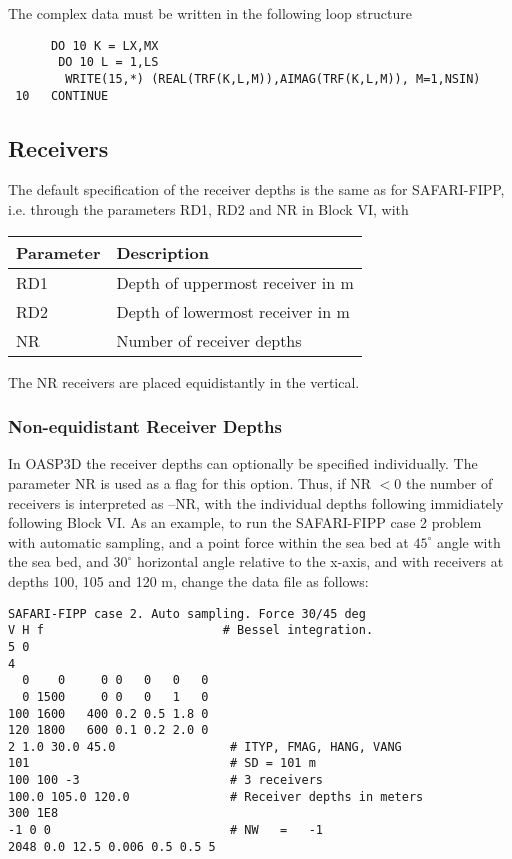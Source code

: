 \noindent The complex data must be written in the following loop structure

\small
\begin{verbatim}
      DO 10 K = LX,MX
       DO 10 L = 1,LS
        WRITE(15,*) (REAL(TRF(K,L,M)),AIMAG(TRF(K,L,M)), M=1,NSIN)
 10   CONTINUE
\end{verbatim}
\normalsize

\subsection{Receivers}

The default specification of the receiver depths is the same as for
SAFARI-FIPP, i.e. through the parameters RD1, RD2 and NR in Block VI, with

\begin{tabular}{ll}
Parameter & Description \\
\hline
RD1 & Depth of uppermost receiver in m \\
RD2 & Depth of lowermost receiver in m \\
NR  & Number of receiver depths 
\end{tabular}

The NR receivers are placed equidistantly in the vertical.

\subsubsection{Non-equidistant Receiver Depths}

In OASP3D the receiver depths can optionally be specified individually.
The parameter NR is used as a flag for this option. Thus, if NR $< 0$
the number of receivers is interpreted as --NR, with the individual
depths following immidiately following Block VI. 
As an example, to run the SAFARI-FIPP case 2 problem with automatic
sampling, and a point force within the sea bed 
at $45^{\circ}$ angle with the sea bed,
and $30^{\circ}$ horizontal angle relative to the x-axis, and with
receivers at depths 100, 105 and 120 m,
change the data file as  follows:

\small
\begin{verbatim}
SAFARI-FIPP case 2. Auto sampling. Force 30/45 deg
V H f                         # Bessel integration.
5 0
4
  0    0     0 0   0   0   0
  0 1500     0 0   0   1   0
100 1600   400 0.2 0.5 1.8 0
120 1800   600 0.1 0.2 2.0 0
2 1.0 30.0 45.0                # ITYP, FMAG, HANG, VANG  
101                            # SD = 101 m
100 100 -3                     # 3 receivers
100.0 105.0 120.0              # Receiver depths in meters
300 1E8                      
-1 0 0                         # NW   =   -1
2048 0.0 12.5 0.006 0.5 0.5 5
\end{verbatim}
\normalsize 

